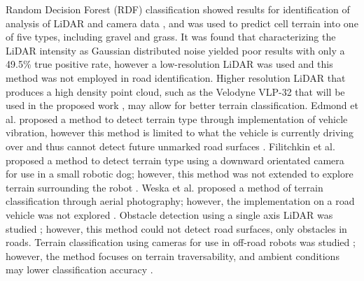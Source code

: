 \documentclass[journal,onecolumn]{IEEEtran}
\begin{document}
	{Random Decision Forest (RDF) classification showed results for identification of analysis of LiDAR and camera data \cite{breiman_random_2001}, and was used to predict cell terrain into one of five types, including gravel and grass. It was found that characterizing the LiDAR intensity as Gaussian distributed noise yielded poor results with only a 49.5\% true positive rate, however a low-resolution LiDAR was used \cite{rauscher_comparison_2016} and this method was not employed in road identification. Higher resolution LiDAR that produces a high density point cloud, such as the Velodyne VLP-32 that will be used in the proposed work \cite{vlp_32c}, may allow for better terrain classification. Edmond et al. proposed a method to detect terrain type through implementation of vehicle vibration, however this method is limited to what the vehicle is currently driving over and thus cannot detect future unmarked road surfaces \cite{dupont_online_2008}. Filitchkin et al. proposed a method to detect terrain type using a downward orientated camera for use in a small robotic dog; however, this method was not extended to explore terrain surrounding the robot \cite{filitchkin_feature_based_2012}. Weska et al. proposed a method of terrain classification through aerial photography; however, the implementation on a road vehicle was not explored \cite{weszka_comparative_1976}. Obstacle detection using a single axis LiDAR was studied \cite{manduchi_obstacle_2005}; however, this method could not detect road surfaces, only obstacles in roads. Terrain classification using cameras for use in off-road robots was studied \cite{walch_offroad_2022}; however, the method focuses on terrain traversability, and ambient conditions may lower classification accuracy \cite{levi_3d_2012_light}. }
	
\end{document}
